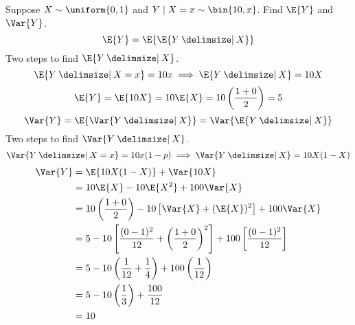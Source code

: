 \begin{Example}{}{}
    Suppose $ X \sim \uniform{0,1} $ and
    $ Y\mid X=x \sim \bin{10,x} $. Find $ \E{Y} $
    and $ \Var{Y} $.
    \[ \E{Y}=\E{\E{Y\given X}} \]
    Two steps to find $ \E{Y\given X} $.
    \[ \E{Y\given X=x}=10x\implies \E{Y\given X}=10X \]
    \[ \E{Y}=\E{10X}=10\E{X}=10\left( \frac{1+0}{2} \right)=5 \]
    \[ \Var{Y}=\E{\Var{Y\given X}}=\Var{\E{Y\given X}} \]
    Two steps to find $ \Var{Y\given X} $.
    \[ \Var{Y\given X=x}=10x(1-p)\implies\Var{Y\given X}=10X(1-X) \]
    \begin{align*}
        \Var{Y}
         & =\E{10X(1-X)}+\Var{10X}                                                 \\
         & =10\E{X}-10\E{X^2}+100\Var{X}                                           \\
         & =10\left( \frac{1+0}{2} \right)-
        10\left[ \Var{X}+(\E{X})^2 \right]+100\Var{X}                              \\
         & =5-10\left[ \frac{(0-1)^2}{12}+\left( \frac{1+0}{2} \right)^2  \right]+
        100\left[ \frac{(0-1)^2}{12} \right]                                       \\
         & =5-10\left( \frac{1}{12} +\frac{1}{4}  \right)+
        100\left( \frac{1}{12} \right)                                             \\
         & =5-10\left( \frac{1}{3} \right)+\frac{100}{12}                          \\
         & =10
    \end{align*}
\end{Example}
